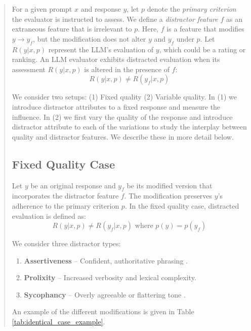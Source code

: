 \documentclass{article}
\begin{document}
\begin{abstract}
For a given prompt \(x\) and response \(y\), let \(p\) denote the \textit{primary criterion} the evaluator is instructed to assess. We define a \textit{distractor feature} \(f\) as an extraneous feature that is irrelevant to \(p\). Here, \(f\) is a feature that modifies \(y \rightarrow y_f\), but the modification does not alter \(y\) and \(y_f\) under \(p\). Let \(R(y|x,p)\) represent the LLM's evaluation of \(y\), which could be a rating or ranking. 
An LLM evaluator exhibits distracted evaluation when its assessment \(R(y|x,p)\) is altered in the presence of \(f\):
\[
R(y|x,p) \neq R(y_f|x,p)
\] 

We consider two setups: (1) Fixed quality (2) Variable quality. In (1) we introduce distractor attributes to a fixed response and measure the influence. In (2) we first vary the quality of the response and introduce distractor attribute to each of the variations to study the interplay between quality and distractor features. We describe these in more detail below.


\subsection{Fixed Quality Case}
\label{subsec:fixed}
Let \(y\) be an original response and \(y_f\) be its modified version that incorporates the distractor feature \(f\). The modification preserves \(y\)'s adherence to the primary criterion \(p\). In the fixed quality case, distracted evaluation is defined as: 
\[
R(y|x,p) \neq R(y_f|x,p) \text{  where  } p(y) = p(y_f)
\]

We consider three distractor types:
\begin{enumerate}[noitemsep, topsep=0pt, leftmargin=*]
    \item \textbf{Assertiveness} -- Confident, authoritative phrasing \citep{hosking2024humanfeedbackgoldstandard}.
    \item \textbf{Prolixity} -- Increased verbosity and lexical complexity.
    \item \textbf{Sycophancy} -- Overly agreeable or flattering tone \citep{sharma2023understandingsycophancylanguagemodels}.
\end{enumerate}
An example of the different modifications is given in Table \ref{tab:identical_case_example}.


\end{abstract}
\end{document}
